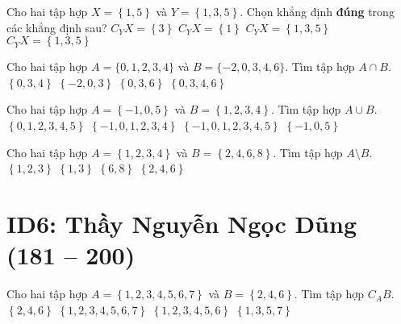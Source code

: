 \begin{ex}%
	Cho hai tập hợp $X=\left\{ 1, 5\right\}$ và $Y=\left\{  1, 3, 5\right\}$. Chọn khẳng định \textbf{đúng} trong các khẳng định sau?
	\choice
	{\True $C_{Y}X= \left\{ 3 \right\}$}
	{$C_{Y}X=\left\{ 1 \right\}$}
	{$C_{Y}X=\left\{ 1, 3, 5 \right\}$}
	{$C_{Y}X=\left\{ 1, 3, 5 \right\}$}
\end{ex}
\begin{ex}%
	Cho hai tập hợp $A=\{0, 1, 2, 3, 4\}$ và $B=\{-2, 0, 3, 4, 6\}$. Tìm tập hợp $A\cap B$.
	\choice
	{\True $\left\{0, 3, 4\right\}$}
	{$\left\{-2, 0, 3\right\}$}
	{$\left\{0, 3, 6\right\}$}
	{$\left\{0, 3, 4, 6\right\}$} 
\end{ex}

\begin{ex}%
	Cho hai tập hợp $A=\left\{-1, 0, 5\right\}$ và $B=\left\{1, 2, 3, 4\right\}$. Tìm tập hợp $A\cup B$.
	\choice
	{$\left\{0, 1, 2, 3, 4, 5\right\}$}
	{$\left\{-1, 0, 1, 2, 3, 4\right\}$}
	{\True $\left\{-1, 0, 1, 2, 3, 4, 5\right\}$}
	{$\left\{-1, 0, 5\right\}$}
\end{ex}

\begin{ex}%
	Cho hai tập hợp $A=\left\{1, 2, 3, 4\right\}$ và $B=\left\{2, 4, 6, 8\right\}$. Tìm tập hợp $A\setminus B$.
	\choice
	{$\left\{1, 2, 3\right\}$}
	{\True $\left\{1, 3\right\}$}
	{$\left\{6, 8\right\}$}
	{$\left\{2, 4, 6\right\}$}
\end{ex}



\section*{ID6: Thầy Nguyễn Ngọc Dũng (181 -- 200)}
\begin{ex}%
	Cho hai tập hợp $A=\left\{1,2,3,4,5,6,7\right\}$ và $B=\left\{2,4,6\right\}$. Tìm tập hợp $C_AB$.
	\choice
	{$\left\{2,4,6\right\}$}
	{$\left\{1,2,3,4,5,6,7\right\}$}
	{$\left\{1,2,3,4,5,6\right\}$}
	{\True $\left\{1,3,5,7\right\}$}
\end{ex}

